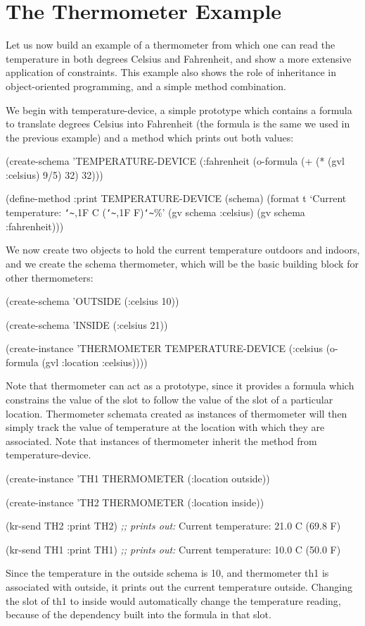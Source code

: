 \section{The Thermometer Example}
\value{s-top}

Let us now build an example of a thermometer from which one can read the
temperature in both degrees Celsius and Fahrenheit, and show a more
extensive application of constraints.  This example also shows the role of
inheritance in object-oriented programming, and a simple method
combination.

We begin with {\sc temperature-device}, a simple
prototype which contains a
formula to translate degrees Celsius into Fahrenheit (the formula is the
same we used in the previous example) and a  method which prints
out both values:
\begin{programexample}
(create-schema 'TEMPERATURE-DEVICE
  (:fahrenheit
    (o-formula (+ (* (gvl :celsius) 9/5) 32) 32)))


(define-method :print TEMPERATURE-DEVICE (schema)
  (format t `Current temperature: {\tt\char`\~},1F C ({\tt\char`\~},1F F){\tt\char`\~}\%'
	  (gv schema :celsius)
	  (gv schema :fahrenheit)))
\end{programexample}

We now create two objects to hold the current temperature outdoors and
indoors, and we create the schema {\sc thermometer},
which will be the basic building block for other
thermometers:
\begin{programexample}
(create-schema 'OUTSIDE
  (:celsius 10))

(create-schema 'INSIDE
  (:celsius 21))

(create-instance 'THERMOMETER TEMPERATURE-DEVICE
  (:celsius (o-formula (gvl :location :celsius))))
\end{programexample}
Note that {\sc thermometer} can act as a prototype, since it provides a
formula which constrains the value of the  slot to follow the
value of the  slot of a particular location.  Thermometer
schemata created as instances of {\sc thermometer} will then simply track the
value of temperature at the location with which they are associated.  Note
that instances of {\sc thermometer} inherit the  method from
{\sc temperature-device}.
\begin{programexample}
(create-instance 'TH1 THERMOMETER
		 (:location outside))

(create-instance 'TH2 THERMOMETER
		 (:location inside))

(kr-send TH2 :print TH2)
{\it ;; prints out:}
Current temperature: 21.0 C (69.8 F)

(kr-send TH1 :print TH1)
{\it ;; prints out:}
Current temperature: 10.0 C (50.0 F)
\end{programexample}
Since the temperature in the {\sc outside} schema is 10, and thermometer
{\sc th1} is associated with {\sc outside}, it prints out the current
temperature outside.  Changing the slot  of {\sc th1} to
{\sc inside} would automatically change the temperature reading, because of
the dependency built into the formula in that slot.

